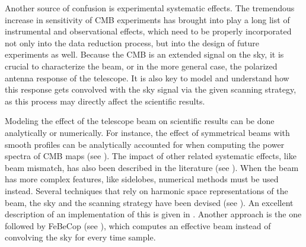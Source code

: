 \documentclass[a4paper,11pt]{article}
\begin{document}
Another source of confusion is experimental systematic effects. The tremendous increase in sensitivity of CMB experiments has brought into play a long list of instrumental and observational effects, which need to be properly incorporated not only into the data reduction process, but into the design of future experiments as well. Because the CMB is an extended signal on the sky, it is crucial to characterize the beam, or in the more general case, the polarized antenna response of the telescope. It is also key to model and understand how this response gets convolved with the sky signal via the given scanning strategy, as this process may directly affect the scientific results.

Modeling the effect of the telescope beam on scientific results can be done analytically or numerically. For instance, the effect of symmetrical beams with smooth profiles can be analytically accounted for when computing the power spectra of CMB maps (see \cite{2003ApJS..148...39P}). The impact of other related systematic effects, like beam mismatch, has also been described in the literature (see \cite{PhysRevD.77.083003, 2007MNRAS.376.1767O, 2015JCAP...03..048D}). When the beam has more complex features, like sidelobes, numerical methods must be used instead. Several techniques that rely on harmonic space representations of the beam, the sky and the scanning strategy have been devised (see \cite{2001PhRvD..63l3002W,2000PhRvD..62l3002C}). An excellent description of an implementation of this is given in \cite{2018arXiv180905034D}. Another approach is the one followed by FeBeCop (see \cite{2011ApJS..193....5M}), which computes an effective beam instead of convolving the sky for every time sample. 

\end{document}
